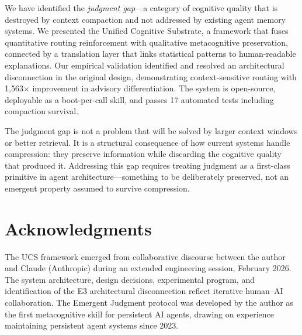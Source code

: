 \documentclass[11pt,a4paper]{article}
\begin{document}
We have identified the \emph{judgment gap}---a category of cognitive
quality that is destroyed by context compaction and not addressed by
existing agent memory systems. We presented the Unified Cognitive
Substrate, a framework that fuses quantitative routing reinforcement
with qualitative metacognitive preservation, connected by a translation
layer that links statistical patterns to human-readable explanations.
Our empirical validation identified and resolved an architectural
disconnection in the original design, demonstrating context-sensitive
routing with 1,563$\times$ improvement in advisory differentiation.
The system is open-source, deployable as a boot-per-call skill, and
passes 17 automated tests including compaction survival.

The judgment gap is not a problem that will be solved by larger context
windows or better retrieval. It is a structural consequence of how
current systems handle compression: they preserve information while
discarding the cognitive quality that produced it. Addressing this
gap requires treating judgment as a first-class primitive in agent
architecture---something to be deliberately preserved, not an emergent
property assumed to survive compression.

\section*{Acknowledgments}

The UCS framework emerged from collaborative discourse between the
author and Claude (Anthropic) during an extended engineering session,
February 2026. The system architecture, design decisions, experimental
program, and identification of the E3 architectural disconnection
reflect iterative human--AI collaboration. The Emergent Judgment
protocol was developed by the author as the first metacognitive skill
for persistent AI agents, drawing on experience maintaining persistent
agent systems since 2023.



\end{document}
